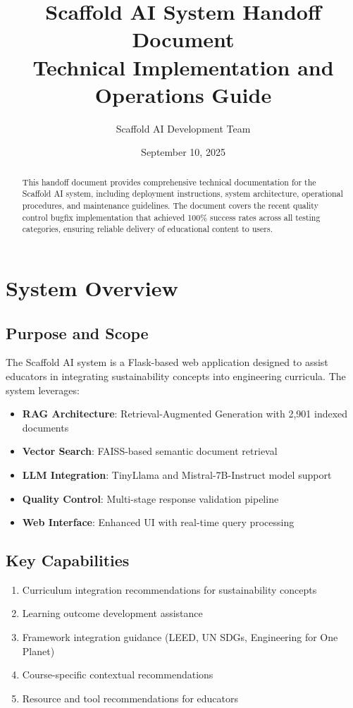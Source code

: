 \documentclass[12pt,a4paper]{article}
\title{\textbf{Scaffold AI System Handoff Document \\ Technical Implementation and Operations Guide}}
\author{Scaffold AI Development Team}
\date{September 10, 2025}
\begin{document}
\maketitle

\begin{abstract}
This handoff document provides comprehensive technical documentation for the Scaffold AI system, including deployment instructions, system architecture, operational procedures, and maintenance guidelines. The document covers the recent quality control bugfix implementation that achieved 100\% success rates across all testing categories, ensuring reliable delivery of educational content to users.
\end{abstract}

\tableofcontents
\newpage

\section{System Overview}

\subsection{Purpose and Scope}
The Scaffold AI system is a Flask-based web application designed to assist educators in integrating sustainability concepts into engineering curricula. The system leverages:

\begin{itemize}
    \item \textbf{RAG Architecture}: Retrieval-Augmented Generation with 2,901 indexed documents
    \item \textbf{Vector Search}: FAISS-based semantic document retrieval
    \item \textbf{LLM Integration}: TinyLlama and Mistral-7B-Instruct model support
    \item \textbf{Quality Control}: Multi-stage response validation pipeline
    \item \textbf{Web Interface}: Enhanced UI with real-time query processing
\end{itemize}

\subsection{Key Capabilities}
\begin{enumerate}
    \item Curriculum integration recommendations for sustainability concepts
    \item Learning outcome development assistance
    \item Framework integration guidance (LEED, UN SDGs, Engineering for One Planet)
    \item Course-specific contextual recommendations
    \item Resource and tool recommendations for educators
\end{enumerate}
\end{document}
